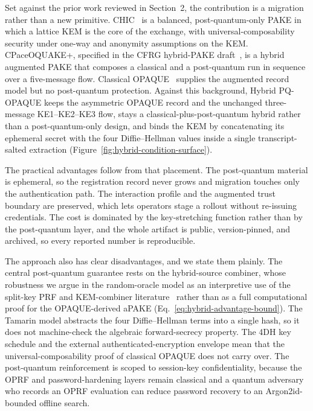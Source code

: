 \documentclass{ieeeijc}
\theoremstyle{remark}
\begin{document}
Set against the prior work reviewed in Section~2, the contribution is a
migration rather than a new primitive. CHIC~\cite{arriaga2024} is a balanced,
post-quantum-only PAKE in which a lattice KEM is the core of the exchange, with
universal-composability security under one-way and anonymity assumptions on the
KEM. CPaceOQUAKE+, specified in the CFRG hybrid-PAKE draft~\cite{vos2025}, is a
hybrid augmented PAKE that composes a classical and a post-quantum run in
sequence over a five-message flow. Classical OPAQUE~\cite{jarecki2018,ietf-opaque}
supplies the augmented record model but no post-quantum protection. Against this
background, Hybrid PQ-OPAQUE keeps the asymmetric OPAQUE record and the unchanged
three-message KE1--KE2--KE3 flow, stays a classical-plus-post-quantum hybrid
rather than a post-quantum-only design, and binds the KEM by concatenating its
ephemeral secret with the four Diffie--Hellman values inside a single
transcript-salted extraction (Figure~\ref{fig:hybrid-condition-surface}).

The practical advantages follow from that placement. The post-quantum material
is ephemeral, so the registration record never grows and migration touches only
the authentication path. The interaction profile and the augmented trust
boundary are preserved, which lets operators stage a rollout without re-issuing
credentials. The cost is dominated by the key-stretching function rather than by
the post-quantum layer, and the whole artifact is public, version-pinned, and
archived, so every reported number is reproducible.

The approach also has clear disadvantages, and we state them plainly. The
central post-quantum guarantee rests on the hybrid-source combiner, whose
robustness we argue in the random-oracle model as an interpretive use of the
split-key PRF and KEM-combiner literature~\cite{giacon2018,bindel2019} rather
than as a full computational proof for the OPAQUE-derived aPAKE
(Eq.~\eqref{eq:hybrid-advantage-bound}). The Tamarin model abstracts the four
Diffie--Hellman terms into a single hash, so it does not machine-check the
algebraic forward-secrecy property. The 4DH key schedule and the external
authenticated-encryption envelope mean that the universal-composability proof of
classical OPAQUE does not carry over. The post-quantum reinforcement is scoped to
session-key confidentiality, because the OPRF and password-hardening layers
remain classical and a quantum adversary who records an OPRF evaluation can
reduce password recovery to an Argon2id-bounded offline search.
\end{document}
